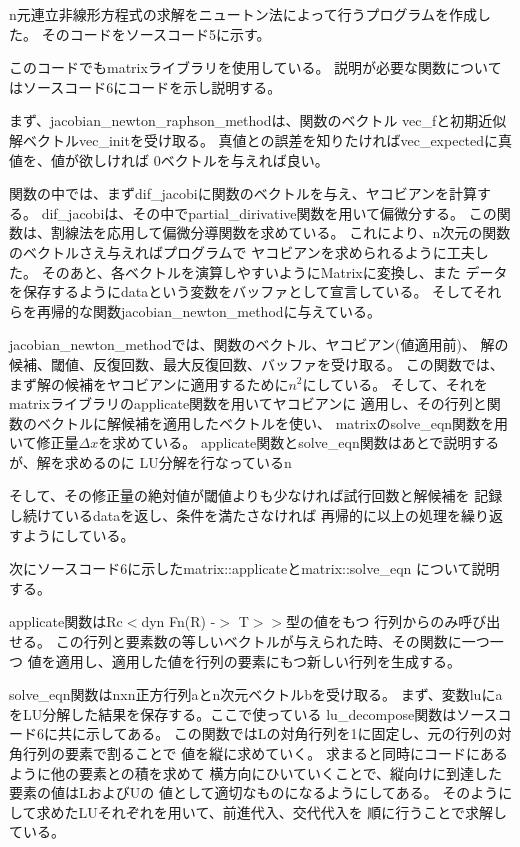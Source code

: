 \documentclass[uplatex, 11pt,a4j, titlepage]{jsarticle}
\begin{document}

\newpage



\subtitle{2019/*/*}


n元連立非線形方程式の求解をニュートン法によって行うプログラムを作成した。
そのコードをソースコード5に示す。

このコードでもmatrixライブラリを使用している。
説明が必要な関数についてはソースコード6にコードを示し説明する。

まず、jacobian\_newton\_raphson\_methodは、関数のベクトル
vec\_fと初期近似解ベクトルvec\_initを受け取る。
真値との誤差を知りたければvec\_expectedに真値を、値が欲しければ
0ベクトルを与えれば良い。

関数の中では、まずdif\_jacobiに関数のベクトルを与え、ヤコビアンを計算する。
dif\_jacobiは、その中でpartial\_dirivative関数を用いて偏微分する。
この関数は、割線法を応用して偏微分導関数を求めている。
これにより、n次元の関数のベクトルさえ与えればプログラムで
ヤコビアンを求められるように工夫した。
そのあと、各ベクトルを演算しやすいようにMatrixに変換し、また
データを保存するようにdataという変数をバッファとして宣言している。
そしてそれらを再帰的な関数jacobian\_newton\_methodに与えている。

jacobian\_newton\_methodでは、関数のベクトル、ヤコビアン(値適用前)、
解の候補、閾値、反復回数、最大反復回数、バッファを受け取る。
この関数では、まず解の候補をヤコビアンに適用するために$n^2$にしている。
そして、それをmatrixライブラリのapplicate関数を用いてヤコビアンに
適用し、その行列と関数のベクトルに解候補を適用したベクトルを使い、
matrixのsolve\_eqn関数を用いて修正量$\Delta x$を求めている。
applicate関数とsolve\_eqn関数はあとで説明するが、解を求めるのに
LU分解を行なっているn

そして、その修正量の絶対値が閾値よりも少なければ試行回数と解候補を
記録し続けているdataを返し、条件を満たさなければ
再帰的に以上の処理を繰り返すようにしている。

次にソースコード6に示したmatrix::applicateとmatrix::solve\_eqn
について説明する。

applicate関数はRc$<$dyn Fn(R) -$>$ T$>$$>$型の値をもつ
行列からのみ呼び出せる。
この行列と要素数の等しいベクトルが与えられた時、その関数に一つ一つ
値を適用し、適用した値を行列の要素にもつ新しい行列を生成する。

solve\_eqn関数はnxn正方行列aとn次元ベクトルbを受け取る。
まず、変数luにaをLU分解した結果を保存する。ここで使っている
lu\_decompose関数はソースコード6に共に示してある。
この関数ではLの対角行列を1に固定し、元の行列の対角行列の要素で割ることで
値を縦に求めていく。
求まると同時にコードにあるように他の要素との積を求めて
横方向にひいていくことで、縦向けに到達した要素の値はLおよびUの
値として適切なものになるようにしてある。
そのようにして求めたLUそれぞれを用いて、前進代入、交代代入を
順に行うことで求解している。
\end{document}
